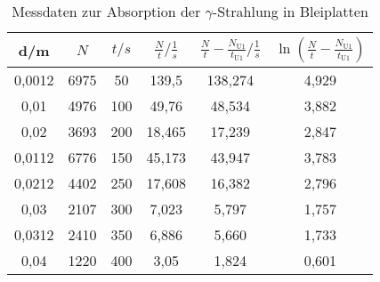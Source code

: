 \begin{table}[h!]
  \centering
  \caption{Messdaten zur Absorption der $\gamma$-Strahlung in Bleiplatten}
  \label{tab:pb}
  \begin{tabular}{c c c c c c}
    \toprule
    d/m  & $N$  & $t/s$ & $\frac{N}{t}/\frac{1}{s}$ & $\frac{N}{t}-\frac{N_{\text{U1}}}{t_{\text{U1}}}/ \frac{1}{s}$ & $\ln{\left( \frac{N}{t}-\frac{N_{\text{U1}}}{t_{\text{U1}}} \right)} $  \\
    \midrule
    0,0012 & 6975   &   50    &  139,5  & 138,274 & 4,929 \\
    0,01   & 4976   &  100    &  49,76  & 48,534  & 3,882 \\
    0,02   & 3693   &  200    &  18,465 & 17,239  & 2,847 \\
    0,0112 & 6776   &  150    &  45,173 & 43,947  & 3,783 \\
    0,0212 & 4402   &  250    &  17,608 & 16,382  & 2,796 \\
    0,03   & 2107   &  300    &  7,023  & 5,797   & 1,757 \\
    0,0312 & 2410   &  350    &  6,886  & 5,660   & 1,733 \\
    0,04   & 1220   &  400    &  3,05   & 1,824   & 0,601 \\

    \bottomrule
  \end{tabular}
\end{table}
